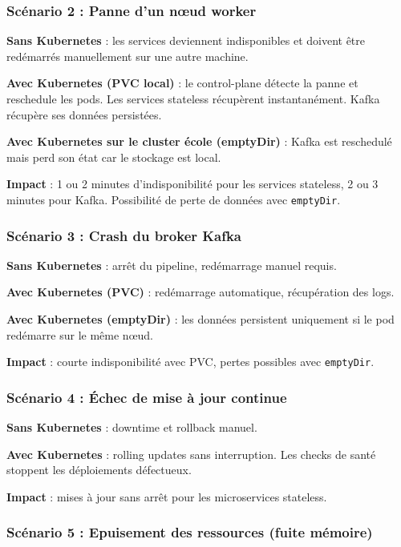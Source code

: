 \documentclass[10pt,a4paper]{article}
\begin{document}
\subsubsection{Scénario 2 : Panne d’un nœud worker}

\textbf{Sans Kubernetes} : les services deviennent indisponibles et doivent être redémarrés manuellement sur une autre machine.

\textbf{Avec Kubernetes (PVC local)} : le control-plane détecte la panne et reschedule les pods. Les services stateless récupèrent instantanément. Kafka récupère ses données persistées.

\textbf{Avec Kubernetes sur le cluster école (emptyDir)} : Kafka est reschedulé mais perd son état car le stockage est local.

\textbf{Impact} :  
1 ou 2 minutes d’indisponibilité pour les services stateless, 2 ou 3 minutes pour Kafka.  
Possibilité de perte de données avec \texttt{emptyDir}.

\subsubsection{Scénario 3 : Crash du broker Kafka}

\textbf{Sans Kubernetes} : arrêt du pipeline, redémarrage manuel requis.

\textbf{Avec Kubernetes (PVC)} : redémarrage automatique, récupération des logs.

\textbf{Avec Kubernetes (emptyDir)} : les données persistent uniquement si le pod redémarre sur le même nœud.

\textbf{Impact} : courte indisponibilité avec PVC, pertes possibles avec \texttt{emptyDir}.

\subsubsection{Scénario 4 : Échec de mise à jour continue}

\textbf{Sans Kubernetes} : downtime et rollback manuel.

\textbf{Avec Kubernetes} : rolling updates sans interruption. Les checks de santé stoppent les déploiements défectueux.

\textbf{Impact} : mises à jour sans arrêt pour les microservices stateless.

\subsubsection{Scénario 5 : Epuisement des ressources (fuite mémoire)}
\end{document}

